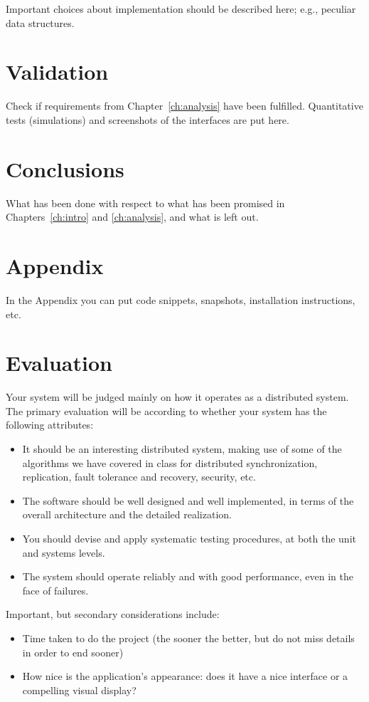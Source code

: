 \documentclass{memoir}
\begin{document}
Important choices about implementation should be described here; e.g., peculiar data structures.


\chapter{Validation}

Check if requirements from Chapter~\ref{ch:analysis} have been fulfilled.
Quantitative tests (simulations) and screenshots of the interfaces are put here.


\chapter{Conclusions}

What has been done with respect to what has been promised in Chapters~\ref{ch:intro} and \ref{ch:analysis}, and what is left out.

\appendix

\chapter{Appendix}

In the Appendix you can put code snippets, snapshots, installation instructions, etc.


\chapter*{Evaluation}
Your system will be judged mainly on how it operates as a distributed system. The primary evaluation will be according to whether your system has the following attributes:
\begin{itemize}
\item  It should be an interesting distributed system, making use of some of the algorithms we have covered in class for distributed synchronization, replication, fault tolerance and recovery, security, etc.
\item The software should be well designed and well implemented, in terms of the overall architecture and the detailed realization.
\item You should devise and apply systematic testing procedures, at both the unit and systems levels.
\item The system should operate reliably and with good performance, even in the face of failures.
\end{itemize}
Important, but secondary considerations include:
\begin{itemize}
\item Time taken to do the project (the sooner the better, but do not miss details in order to end sooner)
\item  How nice is the application's appearance: does it have a nice interface or a compelling visual display?
\end{itemize}
\end{document}
